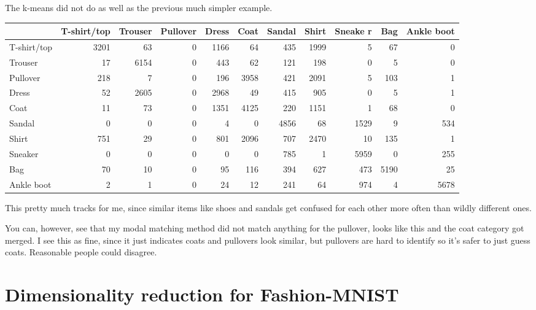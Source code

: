 \documentclass[letterpaper, 11pt]{amsart}
\begin{document}
The k-means did not do as well as the previous much simpler example.

\begin{tabular}{lrrrrrrrrrr}
\toprule
 & T-shirt/top & Trouser & Pullover & Dress & Coat & Sandal & Shirt & Sneake
r & Bag & Ankle boot \\
\midrule
T-shirt/top & 3201 & 63 & 0 & 1166 & 64 & 435 & 1999 & 5 & 67 & 0 \\
Trouser & 17 & 6154 & 0 & 443 & 62 & 121 & 198 & 0 & 5 & 0 \\
Pullover & 218 & 7 & 0 & 196 & 3958 & 421 & 2091 & 5 & 103 & 1 \\
Dress & 52 & 2605 & 0 & 2968 & 49 & 415 & 905 & 0 & 5 & 1 \\
Coat & 11 & 73 & 0 & 1351 & 4125 & 220 & 1151 & 1 & 68 & 0 \\
Sandal & 0 & 0 & 0 & 4 & 0 & 4856 & 68 & 1529 & 9 & 534 \\
Shirt & 751 & 29 & 0 & 801 & 2096 & 707 & 2470 & 10 & 135 & 1 \\
Sneaker & 0 & 0 & 0 & 0 & 0 & 785 & 1 & 5959 & 0 & 255 \\
Bag & 70 & 10 & 0 & 95 & 116 & 394 & 627 & 473 & 5190 & 25 \\
Ankle boot & 2 & 1 & 0 & 24 & 12 & 241 & 64 & 974 & 4 & 5678 \\
\bottomrule
\end{tabular}

This pretty much tracks for me, since similar items like shoes and sandals get confused for each other more often than wildly different ones.

You can, however, see that my modal matching method did not match anything for the pullover, looks like this and the coat category got merged.
I see this as fine, since it just indicates coats and pullovers look similar, but pullovers are hard to identify so it's safer to just guess coats.
Reasonable people could disagree.

\section{Dimensionality reduction for Fashion-MNIST}
\end{document}
